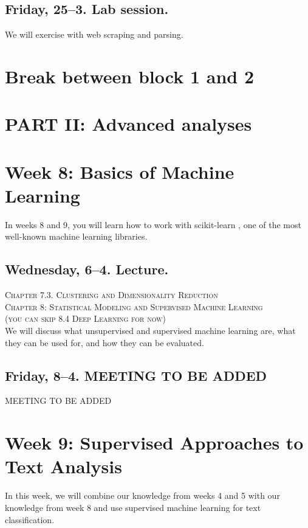 \subsection*{Friday, 25--3. Lab session.}
We will exercise with web scraping and parsing.







\section*{Break between block 1 and 2}

\section*{PART II: Advanced analyses}


\section*{Week 8: Basics of Machine Learning}
In weeks 8 and 9, you will learn how to work with scikit-learn \citep{scikit-learn}, one of the most well-known machine learning libraries.


\subsection*{Wednesday, 6--4. Lecture.}
\textsc{ Chapter 7.3. Clustering and Dimensionality Reduction}\\
\textsc{ Chapter 8: Statistical Modeling and Supervised Machine Learning}\\
\textsc{ (you can skip 8.4 Deep Learning for now)}\\

We will discuss what unsupervised and supervised machine learning are, what they can be used for, and how they can be evaluated.


\subsection*{Friday, 8--4. MEETING TO BE ADDED}
MEETING TO BE ADDED


\section*{Week 9: Supervised Approaches to Text Analysis}
In this week, we will combine our knowledge from weeks 4 and 5 with our knowledge from week 8 and use supervised machine learning for text classification.

